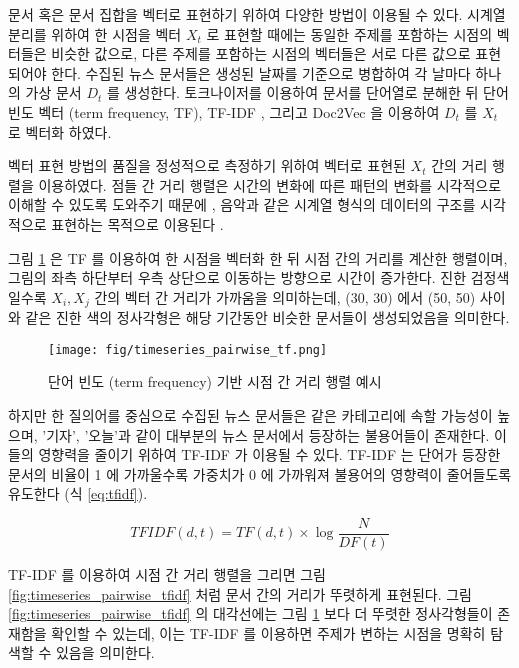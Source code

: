 \documentclass[oneside, ko,phd]{snuthesis_utf8_kor}
\begin{document}
문서 혹은 문서 집합을 벡터로 표현하기 위하여 다양한 방법이 이용될 수 있다.
시계열 분리를 위하여 한 시점을 벡터 $X_t$ 로 표현할 때에는 동일한 주제를 포함하는 시점의 벡터들은 비슷한 값으로, 다른 주제를 포함하는 시점의 벡터들은 서로 다른 값으로 표현되어야 한다.
수집된 뉴스 문서들은 생성된 날짜를 기준으로 병합하여 각 날마다 하나의 가상 문서 $D_t$ 를 생성한다.
토크나이저를 이용하여 문서를 단어열로 분해한 뒤 단어 빈도 벡터 (term frequency, TF), TF-IDF \cite{sparck1972statistical}, 그리고 Doc2Vec \cite{le2014distributed} 을 이용하여 $D_t$ 를 $X_t$ 로 벡터화 하였다.

벡터 표현 방법의 품질을 정성적으로 측정하기 위하여 벡터로 표현된 $X_t$ 간의 거리 행렬을 이용하였다.
점들 간 거리 행렬은 시간의 변화에 따른 패턴의 변화를 시각적으로 이해할 수 있도록 도와주기 때문에 \cite{balasubramanyan2011block}, 음악과 같은 시계열 형식의 데이터의 구조를 시각적으로 표현하는 목적으로 이용된다 \cite{paulus2006music, paulus2010state, mcfee2014analyzing}.

그림 \ref{fig:timeseries_pairwise_tf} 은 TF 를 이용하여 한 시점을 벡터화 한 뒤 시점 간의 거리를 계산한 행렬이며, 그림의 좌측 하단부터 우측 상단으로 이동하는 방향으로 시간이 증가한다.
진한 검정색일수록 $X_i, X_j$ 간의 벡터 간 거리가 가까움을 의미하는데, (30, 30) 에서 (50, 50) 사이와 같은 진한 색의 정사각형은 해당 기간동안 비슷한 문서들이 생성되었음을 의미한다.

\begin{figure}[H]
\centering
\texttt{[image: fig/timeseries\_pairwise\_tf.png]}
\caption{단어 빈도 (term frequency) 기반 시점 간 거리 행렬 예시}
\label{fig:timeseries_pairwise_tf}
\end{figure}

하지만 한 질의어를 중심으로 수집된 뉴스 문서들은 같은 카테고리에 속할 가능성이 높으며, '기자', '오늘'과 같이 대부분의 뉴스 문서에서 등장하는 불용어들이 존재한다.
이들의 영향력을 줄이기 위하여 TF-IDF 가 이용될 수 있다.
TF-IDF 는 단어가 등장한 문서의 비율이 1 에 가까울수록 가중치가 0 에 가까워져 불용어의 영향력이 줄어들도록 유도한다 (식 \ref{eq:tfidf}).

\begin{equation}
TFIDF(d,t) = TF(d,t) \times \log \frac{N}{DF(t)}
\label{eq:tfidf}
\end{equation}

TF-IDF 를 이용하여 시점 간 거리 행렬을 그리면 그림 \ref{fig:timeseries_pairwise_tfidf} 처럼 문서 간의 거리가 뚜렷하게 표현된다.
그림 \ref{fig:timeseries_pairwise_tfidf} 의 대각선에는 그림 \ref{fig:timeseries_pairwise_tf} 보다 더 뚜렷한 정사각형들이 존재함을 확인할 수 있는데, 이는 TF-IDF 를 이용하면 주제가 변하는 시점을 명확히 탐색할 수 있음을 의미한다.
\end{document}
